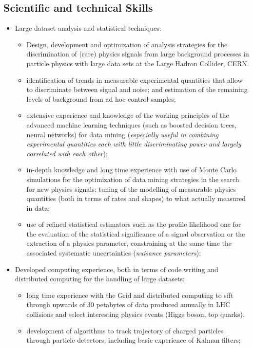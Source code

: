 \documentclass{article}
\begin{document}
\begin{vita}
\section*{Scientific and technical Skills}
\begin{itemize}
\item Large dataset analysis and statistical techniques: 
\begin{itemize} 
\item Design, development and optimization of analysis strategies for the discrimination of (rare) physics signals from large background processes in particle physics with large data sets at the Large Hadron Collider, CERN. 
\item identification of trends in measurable experimental quantities that allow to discriminate between signal and noise; and estimation of the remaining levels of background from ad hoc control samples;
\item extensive experience and knowledge of the working principles of the advanced machine learning techniques (such as boosted decision trees, neural networks) for data mining ({\it especially useful in combining experimental quantities each with little discriminating power and largely correlated with each other});
\item in-depth knowledge and long time experience with use of Monte Carlo simulations for the optimization of data mining strategies in the search for new physics signals; tuning of the modelling of measurable physics quantities (both in terms of rates and shapes) to what actually measured in data;
\item use of refined statistical estimators such as the profile likelihood one for the evaluation of the statistical significance of a signal observation or the extraction of a physics parameter, constraining at the same time the associated systematic uncertainties ({\it nuisance parameters});
\end{itemize}
\item Developed computing experience, both in terms of code writing and distributed computing for the handling of large datasets:
\begin{itemize}
\item long time experience with the Grid and distributed computing to sift through upwards of 30 petabytes of data produced annually in LHC collisions and select interesting physics events (Higgs boson, top quarks).
\item development of algorithms to track trajectory of charged particles through particle detectors, including basic experience of Kalman filters;

\end{itemize}
\end{itemize}
\end{vita}
\end{document}
